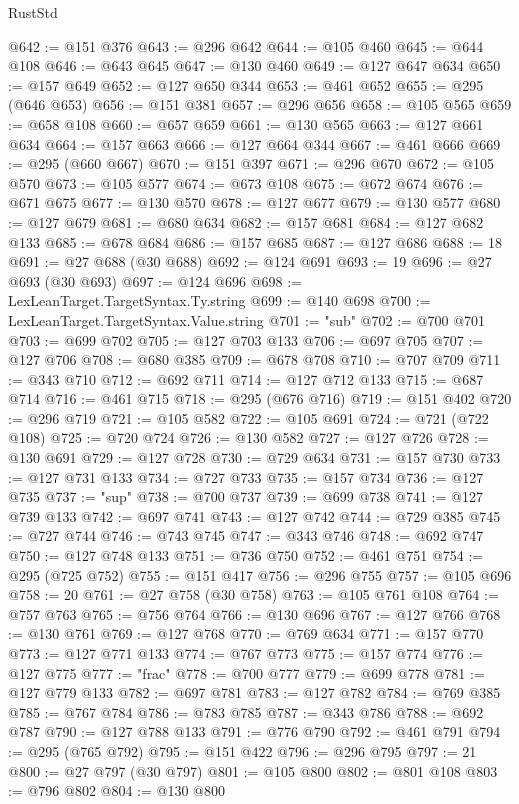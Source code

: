 \begin{lexlean}{RustStd}
\begin{coremodule}
@642 := @151 @376
@643 := @296 @642
@644 := @105 @460
@645 := @644 @108
@646 := @643 @645
@647 := @130 @460
@649 := @127 @647 @634
@650 := @157 @649
@652 := @127 @650 @344
@653 := @461 @652
@655 := @295 (@646 @653)
@656 := @151 @381
@657 := @296 @656
@658 := @105 @565
@659 := @658 @108
@660 := @657 @659
@661 := @130 @565
@663 := @127 @661 @634
@664 := @157 @663
@666 := @127 @664 @344
@667 := @461 @666
@669 := @295 (@660 @667)
@670 := @151 @397
@671 := @296 @670
@672 := @105 @570
@673 := @105 @577
@674 := @673 @108
@675 := @672 @674
@676 := @671 @675
@677 := @130 @570
@678 := @127 @677
@679 := @130 @577
@680 := @127 @679
@681 := @680 @634
@682 := @157 @681
@684 := @127 @682 @133
@685 := @678 @684
@686 := @157 @685
@687 := @127 @686
@688 := 18
@691 := @27 @688 (@30 @688)
@692 := @124 @691
@693 := 19
@696 := @27 @693 (@30 @693)
@697 := @124 @696
@698 := LexLeanTarget.TargetSyntax.Ty.string
@699 := @140 @698
@700 := LexLeanTarget.TargetSyntax.Value.string
@701 := "sub"
@702 := @700 @701
@703 := @699 @702
@705 := @127 @703 @133
@706 := @697 @705
@707 := @127 @706
@708 := @680 @385
@709 := @678 @708
@710 := @707 @709
@711 := @343 @710
@712 := @692 @711
@714 := @127 @712 @133
@715 := @687 @714
@716 := @461 @715
@718 := @295 (@676 @716)
@719 := @151 @402
@720 := @296 @719
@721 := @105 @582
@722 := @105 @691
@724 := @721 (@722 @108)
@725 := @720 @724
@726 := @130 @582
@727 := @127 @726
@728 := @130 @691
@729 := @127 @728
@730 := @729 @634
@731 := @157 @730
@733 := @127 @731 @133
@734 := @727 @733
@735 := @157 @734
@736 := @127 @735
@737 := "sup"
@738 := @700 @737
@739 := @699 @738
@741 := @127 @739 @133
@742 := @697 @741
@743 := @127 @742
@744 := @729 @385
@745 := @727 @744
@746 := @743 @745
@747 := @343 @746
@748 := @692 @747
@750 := @127 @748 @133
@751 := @736 @750
@752 := @461 @751
@754 := @295 (@725 @752)
@755 := @151 @417
@756 := @296 @755
@757 := @105 @696
@758 := 20
@761 := @27 @758 (@30 @758)
@763 := @105 @761 @108
@764 := @757 @763
@765 := @756 @764
@766 := @130 @696
@767 := @127 @766
@768 := @130 @761
@769 := @127 @768
@770 := @769 @634
@771 := @157 @770
@773 := @127 @771 @133
@774 := @767 @773
@775 := @157 @774
@776 := @127 @775
@777 := "frac"
@778 := @700 @777
@779 := @699 @778
@781 := @127 @779 @133
@782 := @697 @781
@783 := @127 @782
@784 := @769 @385
@785 := @767 @784
@786 := @783 @785
@787 := @343 @786
@788 := @692 @787
@790 := @127 @788 @133
@791 := @776 @790
@792 := @461 @791
@794 := @295 (@765 @792)
@795 := @151 @422
@796 := @296 @795
@797 := 21
@800 := @27 @797 (@30 @797)
@801 := @105 @800
@802 := @801 @108
@803 := @796 @802
@804 := @130 @800

\end{coremodule}
\end{lexlean}

